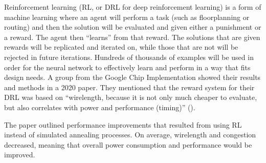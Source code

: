 
Reinforcement learning (RL, or DRL for deep reinforcement
learning) is a form of machine learning where an agent
will perform a task (such as floorplanning or routing)
and then the solution will be evaluated and given either
a punishment or a reward. The agent then ``learns''
from that reward. The solutions that are given rewards
will be replicated and iterated on, while those that
are not will be rejected in future iterations. Hundreds
of thousands of examples will be used in order for the
neural network to effectively learn and perform in a
way that fits design needs. A group from the Google
Chip Implementation showed their results and methods
in a 2020 paper. They mentioned that the reward system
for their DRL was based on ``wirelength, because it
is not only much cheaper to evaluate, but also correlates
with power and performance (timing)'' (\cite{DBLP:journals/corr/abs-2004-10746}).

The paper outlined performance improvements that resulted
from using RL instead of simulated annealing processes. On
average, wirelength and congestion decreased, meaning that
overall power consumption and performance would be improved.
